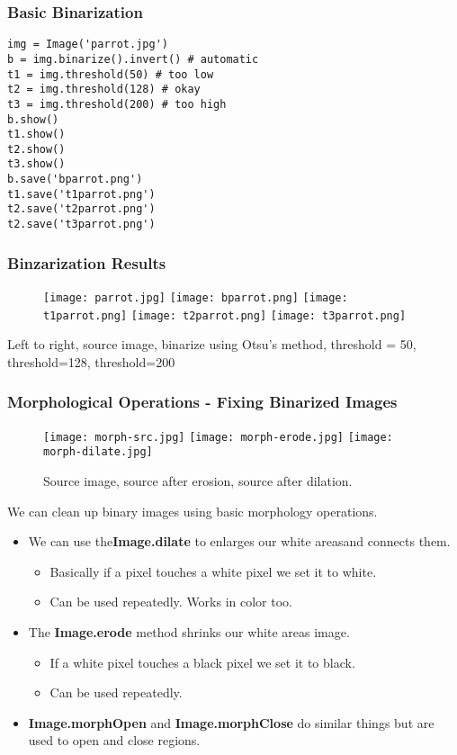 \documentclass[compress]{beamer}
\begin{document}
\begin{frame}[fragile] 
\frametitle{Basic Binarization}
\begin{example}
\begin{verbatim}
img = Image('parrot.jpg')
b = img.binarize().invert() # automatic
t1 = img.threshold(50) # too low
t2 = img.threshold(128) # okay
t3 = img.threshold(200) # too high
b.show()
t1.show()
t2.show()
t3.show()
b.save('bparrot.png')
t1.save('t1parrot.png')
t2.save('t2parrot.png')
t2.save('t3parrot.png')
\end{verbatim}
\end{example}
\end{frame}
\begin{frame}
\frametitle{Binzarization Results}
 \begin{figure}
     \texttt{[image: parrot.jpg]}
     \quad
     \texttt{[image: bparrot.png]}
     \quad
     \texttt{[image: t1parrot.png]}
     \quad
     \texttt{[image: t2parrot.png]}
     \quad
     \texttt{[image: t3parrot.png]}
 \end{figure}
Left to right, source image, binarize using Otsu's method, threshold =
50, threshold=128, threshold=200
\end{frame}
\begin{frame}
  \frametitle{Morphological Operations - Fixing Binarized Images}
 \begin{figure}
     \texttt{[image: morph-src.jpg]}
     \quad
     \texttt{[image: morph-erode.jpg]}
     \quad
     \texttt{[image: morph-dilate.jpg]}
     \caption{Source image, source after erosion, source after dilation.}
 \end{figure}

We can clean up binary images using basic morphology operations.
\begin{itemize}
\item We can use the\textbf{Image.dilate} to enlarges our white areasand
  connects them.
  \begin{itemize}
  \item Basically if a pixel touches a white pixel we set it to white.
  \item Can be used repeatedly. Works in color too.
  \end{itemize}
\item The \textbf{Image.erode} method shrinks our white areas
  image.
   \begin{itemize}
   \item If a white pixel touches a black pixel we set it to black.
   \item Can be used repeatedly.
  \end{itemize}
\item \textbf{Image.morphOpen} and \textbf{Image.morphClose} do
  similar things but are used to open and close regions.
\end{itemize}
\end{frame}
\end{document}
